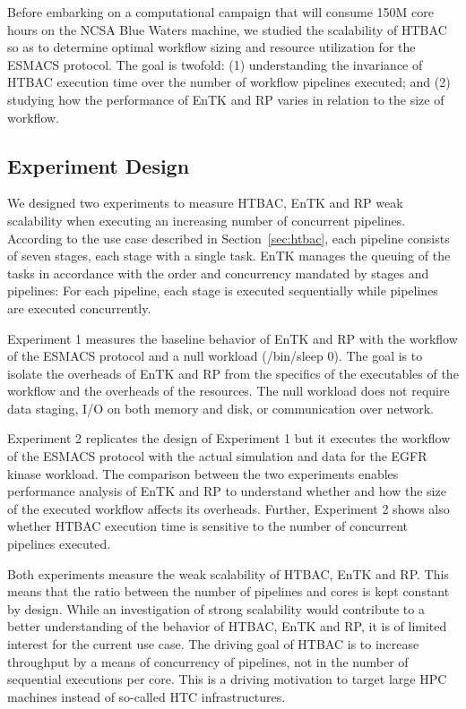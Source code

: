 
Before embarking on a computational campaign that will consume 150M core
hours on the NCSA Blue Waters machine, we studied the scalability of HTBAC so
as to determine optimal workflow sizing and resource utilization for the
ESMACS protocol. The goal is twofold: (1) understanding the invariance of
HTBAC execution time over the number of workflow pipelines executed; and (2)
studying how the performance of EnTK and RP varies in relation to the size of
workflow.

\subsection{Experiment Design}\label{ssec:exp_design}

We designed two experiments to measure HTBAC, EnTK and RP weak scalability
when executing an increasing number of concurrent pipelines. According to the
use case described in Section~\ref{sec:htbac}, each pipeline consists of
seven stages, each stage with a single task. EnTK manages the queuing of the
tasks in accordance with the order and concurrency mandated by stages and
pipelines: For each pipeline, each stage is executed sequentially while
pipelines are executed concurrently.

Experiment 1 measures the baseline behavior of EnTK and RP with the workflow
of the ESMACS protocol and a null workload (\textmd{/bin/sleep 0}). The goal
is to isolate the overheads of EnTK and RP from the specifics of the
executables of the workflow and the overheads of the resources. The null
workload does not require data staging, I/O on both memory and disk, or
communication over network.

Experiment 2 replicates the design of Experiment 1 but it executes the
workflow of the ESMACS protocol with the actual simulation and data for the
EGFR kinase workload. The comparison between the two experiments enables
performance analysis of EnTK and RP to understand whether and how the size of
the executed workflow affects its overheads. Further, Experiment 2 shows also
whether HTBAC execution time is sensitive to the number of concurrent
pipelines executed.

Both experiments measure the weak scalability of HTBAC, EnTK and RP\@. This
means that the ratio between the number of pipelines and cores is kept
constant by design. While an investigation of strong scalability would
contribute to a better understanding of the behavior of HTBAC, EnTK and RP,
it is of limited interest for the current use case. The driving goal of HTBAC
is to increase throughput by a means of concurrency of pipelines, not in the
number of sequential executions per core. This is a driving motivation to
target large HPC machines instead of so-called HTC infrastructures.

